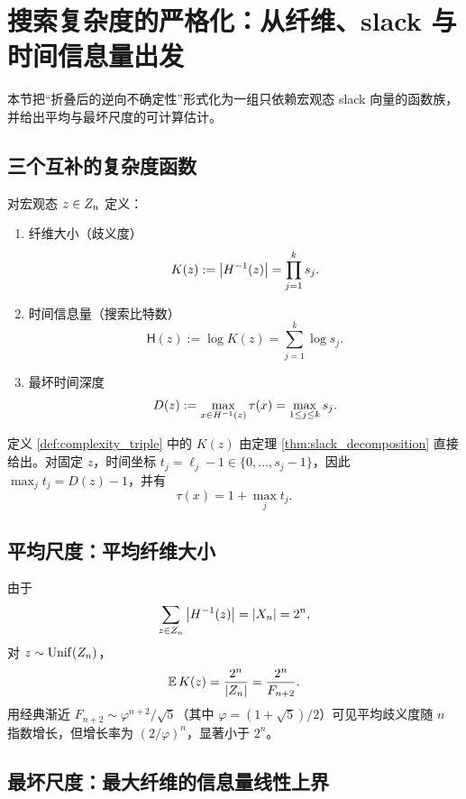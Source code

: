 
\section{搜索复杂度的严格化：从纤维、slack 与时间信息量出发}

本节把“折叠后的逆向不确定性”形式化为一组只依赖宏观态 slack 向量的函数族，并给出平均与最坏尺度的可计算估计。

\subsection{三个互补的复杂度函数}

\begin{definition}\label{def:complexity_triple}
对宏观态 $z\in Z_n$ 定义：
\begin{enumerate}
  \item 纤维大小（歧义度）
  $$
  K(z):=\left\lvert H^{-1}(z)\right\rvert=\prod_{j=1}^k s_j.
  $$
  \item 时间信息量（搜索比特数）
  $$
  \mathsf{H}(z):=\log K(z)=\sum_{j=1}^k \log s_j.
  $$
  \item 最坏时间深度
  $$
  D(z):=\max_{x\in H^{-1}(z)} \tau(x)=\max_{1\le j\le k} s_j.
  $$
\end{enumerate}
\end{definition}

\begin{remark}
定义 \ref{def:complexity_triple} 中的 $K(z)$ 由定理 \ref{thm:slack_decomposition} 直接给出。对固定 $z$，时间坐标 $t_j=\ell_j-1\in\{0,\ldots,s_j-1\}$，因此 $\max_j t_j = D(z)-1$，并有
$$
\tau(x)=1+\max_j t_j.
$$
\end{remark}

\subsection{平均尺度：平均纤维大小}

由于
$$
\sum_{z\in Z_n} \left\lvert H^{-1}(z)\right\rvert=\left\lvert X_n\right\rvert=2^n,
$$
对 $z\sim \mathrm{Unif}(Z_n)$，
$$
\mathbb{E}\,K(z)=\frac{2^n}{\left\lvert Z_n\right\rvert}=\frac{2^n}{F_{n+2}}.
$$
用经典渐近 $F_{n+2}\sim \varphi^{n+2}/\sqrt{5}$（其中 $\varphi=(1+\sqrt5)/2$）可见平均歧义度随 $n$ 指数增长，但增长率为 $(2/\varphi)^n$，显著小于 $2^n$。

\subsection{最坏尺度：最大纤维的信息量线性上界}


